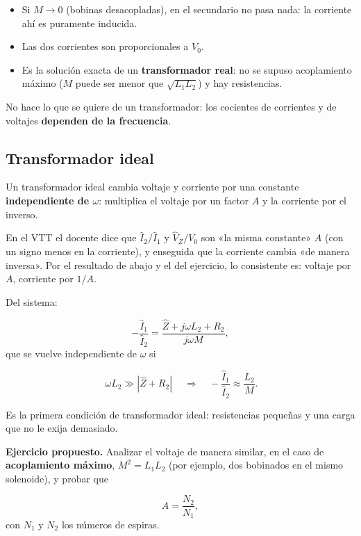 \documentclass[12pt,a4paper]{article}
\begin{document}
\begin{itemize}
  \item Si $M\to0$ (bobinas desacopladas), en el secundario no pasa nada: la
  corriente ahí es puramente inducida.
  \item Las dos corrientes son proporcionales a $V_0$.
  \item Es la solución exacta de un \textbf{transformador real}: no se supuso acoplamiento
  máximo ($M$ puede ser menor que $\sqrt{L_1L_2}$) y hay resistencias.
\end{itemize}

No hace lo que se quiere de un transformador: los cocientes de corrientes y de
voltajes \textbf{dependen de la frecuencia}.

\subsection{Transformador ideal}

Un transformador ideal cambia voltaje y corriente por una constante
\textbf{independiente de $\omega$}: multiplica el voltaje por un factor $A$ y la
corriente por el inverso.

\begin{notebox}
En el VTT el docente dice que $\hat I_2/\hat I_1$ y $\hat V_Z/V_0$ son «la misma
constante» $A$ (con un signo menos en la corriente), y enseguida que la
corriente cambia «de manera inversa». Por el resultado de abajo y el del
ejercicio, lo consistente es: voltaje por $A$, corriente por $1/A$.
\end{notebox}

Del sistema:

\[
-\frac{\hat I_1}{\hat I_2} = \frac{\hat Z + j\omega L_2 + R_2}{j\omega M},
\]
que se vuelve independiente de $\omega$ si

\begin{keybox}
\[
\boxed{\ \omega L_2 \gg |\hat Z + R_2|\ }
\quad\Longrightarrow\quad
-\frac{\hat I_1}{\hat I_2}\approx\frac{L_2}{M}.
\]
\end{keybox}

Es la primera condición de transformador ideal: resistencias pequeñas y una
carga que no le exija demasiado.

\textbf{Ejercicio propuesto.} Analizar el voltaje de manera similar, en el caso de
\textbf{acoplamiento máximo}, $M^2 = L_1L_2$ (por ejemplo, dos bobinados en el mismo
solenoide), y probar que

\[
A = \frac{N_2}{N_1},
\]
con $N_1$ y $N_2$ los números de espiras.
\end{document}
